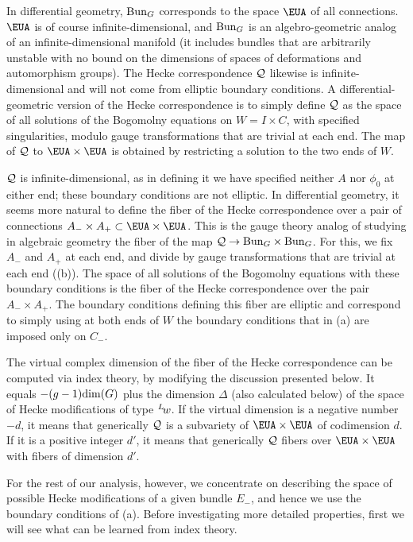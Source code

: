 In differential geometry, ${\rm Bun}_G$ corresponds to the space
$\EUA$ of all connections.  $\EUA$ is of course
infinite-dimensional, and ${\rm Bun}_G$ is an algebro-geometric
analog of an infinite-dimensional manifold (it includes bundles
that are arbitrarily unstable with no bound on the dimensions of
spaces of deformations and automorphism groups).  The Hecke
correspondence ${\cal Q}$ likewise is infinite-dimensional and
will not come from elliptic boundary conditions.  A
differential-geometric version of the Hecke correspondence is to
simply define ${\cal Q}$ as the space of all solutions of the
Bogomolny equations on $W=I\times C$, with specified
singularities, modulo gauge transformations that are trivial at
each end. The map of ${\cal Q}$ to $\EUA\times \EUA$ is obtained
by restricting a solution to the two ends of $W$.

${\cal Q}$ is infinite-dimensional, as in defining it we have
specified neither $A$ nor $\phi_0$ at either end; these boundary
conditions are not elliptic.  In differential geometry, it seems
more natural to define the fiber of the Hecke correspondence over
a pair of connections $A_-\times A_+\subset \EUA\times \EUA$. This
is the gauge theory analog of studying in algebraic geometry the
fiber of the map  ${\cal Q}\to {\rm Bun}_G\times {\rm Bun}_G$. For
this, we fix $A_-$ and $A_+$ at each end, and divide by gauge
transformations that are trivial at each end (\utampo(b)). The
space of all solutions of the Bogomolny equations with these
boundary conditions is the fiber of the Hecke correspondence over
the pair $A_-\times A_+$. The boundary conditions defining this
fiber are elliptic and correspond to simply using at both ends of
$W$ the boundary conditions that in \utampo(a) are imposed only on
$C_-$.

The virtual complex dimension of the fiber of the Hecke
correspondence can be computed via index theory, by modifying the
discussion presented below.  It equals $-(g-1){\rm dim}(G)$ plus
the dimension $\Delta$ (also calculated below) of the space of
Hecke modifications of type $^L\negthinspace w$. If the virtual
dimension is a negative number $-d$, it means that generically
${\cal Q}$ is a subvariety of $\EUA\times \EUA$ of codimension
$d$. If it is a positive integer $d'$, it means that generically
${\cal Q}$ fibers over $\EUA\times \EUA$ with fibers of dimension
$d'$.

For the rest of our analysis, however, we concentrate on
describing the space of possible Hecke modifications of a given
bundle $E_-$, and hence we use the boundary conditions of
\utampo(a).  Before investigating more detailed properties, first
we will see what can be learned from index theory.

